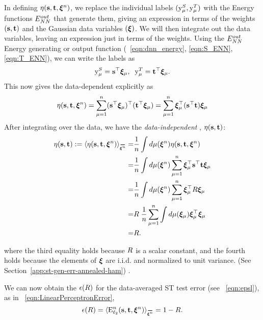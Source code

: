 In defining $\eta({\mathbf{s}},{\mathbf{t}},\boldsymbol{\xi}^{n})$, we replace the individual labels $(\mathrm{y}_{\mu}^{S},\mathrm{y}_{\mu}^{T})$ with the Energy functions $E^{out}_{NN}$ that generate them, giving an expression in terms of the weights $({\mathbf{s}},{\mathbf{t}})$ and the Gaussian data variables $(\boldsymbol{\xi})$. We will then integrate out the data variables, leaving an expression just in terms of the weights.  
Using the $E^{out}_{NN}$ Energy generating or output function (\EQN~\ref{eqn:dnn_energy}, \ref{eqn:S_ENN}, \ref{eqn:T_ENN}), we can write the labels as
\begin{align}
\mathrm{y}_{\mu}^{S}={\mathbf{s}}^{\top}\boldsymbol{\xi}_{\mu},\;\;
\mathrm{y}_{\mu}^{T}={\mathbf{t}}^{\top}\boldsymbol{\xi}_{\mu}  .
\end{align}
This now gives the data-dependent \SelfOverlap explicitly as
\begin{align}
  \label{eqn:eta_vec_xi_def}
\eta({\mathbf{s}},{\mathbf{t}},\boldsymbol{\xi}^{n}) =\sum_{\mu=1}^{n} ({\mathbf{s}}^{\top}\boldsymbol{\xi}_{\mu})^{\top} ({\mathbf{t}}^{\top}\boldsymbol{\xi}_{\mu}) = \sum_{\mu=1}^{n}\boldsymbol{\xi}^{\top}_{\mu}  ({\mathbf{s}}^{\top} {\mathbf{t}} )\boldsymbol{\xi}_{\mu} 
\end{align}
After integrating over the data, we have the \emph{data-independent \SelfOverlap}, $\eta({\mathbf{s}},{\mathbf{t}})$:
\begin{align}
\ETA(\SVEC,\TVEC) := \langle\ETA(\SVEC,\TVEC,\NDXI)\rangle_{\AVGNDXI}
   = & \frac{1}{\ND}\int d\mu(\NDXI)\ETA(\SVEC,\TVEC,\NDXI) \nonumber \\
= & \frac{1}{\ND}\int d\mu(\NDXI)\sum_{\mu=1}^{\ND}\XI_{\mu}^{\top}\SVEC^{\top}\TVEC\XI_{\mu} \nonumber \\
= & \frac{1}{\ND}\int d\mu(\NDXI)\sum_{\mu=1}^{\ND}\XI_{\mu}^{\top}\AVGR\XI_{\mu} \nonumber \\
= & \AVGR\;\frac{1}{\ND}\sum_{\mu=1}^{\ND}\int d\mu(\XI_{\mu})\XI_{\mu}^{\top}\XI_{\mu} \nonumber \\
   = &\AVGR. 
      \label{eqn:eta_vec_avg_def}
\end{align}

where the third equality holds because $R$ is a scalar constant, and the fourth holds because the elements of $\boldsymbol{\xi}$ are i.i.d. and normalized to unit variance.
(See Section~\ref{app:st-gen-err-annealed-ham}) .

We can now obtain the \EffectivePotential $\epsilon(R)$ for the data-averaged ST test error (see \EQN~\ref{eqn:epsl}),  as in \EQN~\ref{eqn:LinearPerceptronError},
\begin{equation}
\label{eqn:epslR}
\EPSL(\AVGR)=\langle\DETOPSTLL\rangle_{\AVGNDXI} =  1 - \AVGR.
\end{equation}

